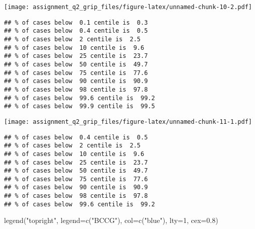 \documentclass[
]{article}
\newenvironment{Shaded}{\begin{snugshade}}{\end{snugshade}}
\newcommand{\AttributeTok}[1]{\textcolor[rgb]{0.77,0.63,0.00}{#1}}
\newcommand{\CommentTok}[1]{\textcolor[rgb]{0.56,0.35,0.01}{\textit{#1}}}
\newcommand{\DecValTok}[1]{\textcolor[rgb]{0.00,0.00,0.81}{#1}}
\newcommand{\FloatTok}[1]{\textcolor[rgb]{0.00,0.00,0.81}{#1}}
\newcommand{\FunctionTok}[1]{\textcolor[rgb]{0.00,0.00,0.00}{#1}}
\newcommand{\NormalTok}[1]{#1}
\newcommand{\SpecialCharTok}[1]{\textcolor[rgb]{0.00,0.00,0.00}{#1}}
\newcommand{\StringTok}[1]{\textcolor[rgb]{0.31,0.60,0.02}{#1}}
\begin{document}
\texttt{[image: assignment\_q2\_grip\_files/figure-latex/unnamed-chunk-10-2.pdf]}

\begin{verbatim}
## % of cases below  0.1 centile is  0.3 
## % of cases below  0.4 centile is  0.5 
## % of cases below  2 centile is  2.5 
## % of cases below  10 centile is  9.6 
## % of cases below  25 centile is  23.7 
## % of cases below  50 centile is  49.7 
## % of cases below  75 centile is  77.6 
## % of cases below  90 centile is  90.9 
## % of cases below  98 centile is  97.8 
## % of cases below  99.6 centile is  99.2 
## % of cases below  99.9 centile is  99.5
\end{verbatim}

\begin{Shaded}
\end{Shaded}

\texttt{[image: assignment\_q2\_grip\_files/figure-latex/unnamed-chunk-11-1.pdf]}

\begin{Shaded}
\end{Shaded}

\begin{verbatim}
## % of cases below  0.4 centile is  0.5 
## % of cases below  2 centile is  2.5 
## % of cases below  10 centile is  9.6 
## % of cases below  25 centile is  23.7 
## % of cases below  50 centile is  49.7 
## % of cases below  75 centile is  77.6 
## % of cases below  90 centile is  90.9 
## % of cases below  98 centile is  97.8 
## % of cases below  99.6 centile is  99.2
\end{verbatim}

\begin{Shaded}
\begin{Highlighting}[]
\FunctionTok{legend}\NormalTok{(}\StringTok{"topright"}\NormalTok{, }\AttributeTok{legend=}\FunctionTok{c}\NormalTok{(}\StringTok{"BCCG"}\NormalTok{), }\AttributeTok{col=}\FunctionTok{c}\NormalTok{(}\StringTok{"blue"}\NormalTok{), }\AttributeTok{lty=}\DecValTok{1}\NormalTok{, }\AttributeTok{cex=}\FloatTok{0.8}\NormalTok{)}
\end{Highlighting}
\end{Shaded}
\end{document}
